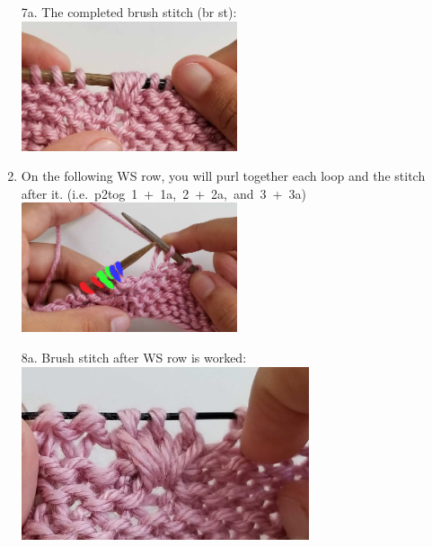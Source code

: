 \documentclass[12pt]{article}
\begin{document}
\begin{multicols}{2}
\begin{enumerate}
\item[7a.] The completed brush stitch (br st): \\
\includegraphics[height=1.5in]{8_finishedRS.jpg}

\item On the following WS row, you will purl together each loop and the stitch after it. \mbox{(i.e. p2tog 1 + 1a, 2 + 2a, and 3 + 3a)} \\
\includegraphics[height=1.5in]{9_WS.jpg}

\item[8a.] Brush stitch after WS row is worked:
\\ \includegraphics[height=2in]{10_finishedWS.jpg}

\end{enumerate}
\columnbreak

\hspace{1em}\\

\end{multicols}
\end{document}
